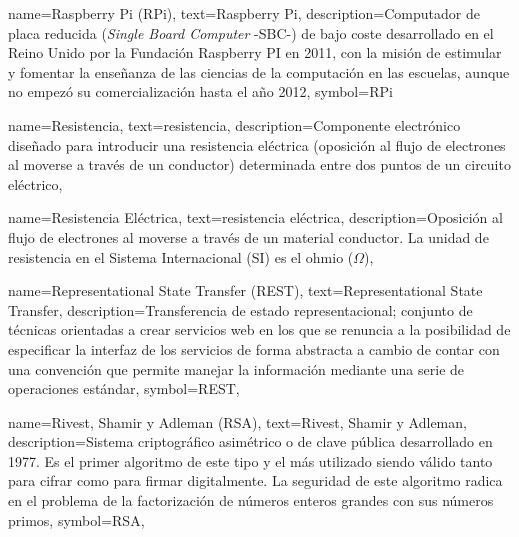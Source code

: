 {
    name={Raspberry Pi (RPi)},
    text={Raspberry Pi},
    description={Computador de placa reducida (\textit{Single Board Computer} -SBC-) de bajo coste desarrollado en el Reino Unido por la Fundación Raspberry PI en 2011, con la misión de estimular y fomentar la enseñanza de las ciencias de la computación en las escuelas, aunque no empezó su comercialización hasta el año 2012},
    symbol={RPi}
}

{
    name={Resistencia},
    text={resistencia},
    description={Componente electrónico diseñado para introducir una resistencia eléctrica (oposición al flujo de electrones al moverse a través de un conductor) determinada entre dos puntos de un circuito eléctrico},
}

{
    name={Resistencia Eléctrica},
    text={resistencia eléctrica},
    description={Oposición al flujo de electrones al moverse a través de un material conductor. La unidad de resistencia en el Sistema Internacional (SI) es el ohmio ($\Omega$)},
}

{
    name={Representational State Transfer (REST)},
    text={Representational State Transfer},
    description={Transferencia de estado representacional; conjunto de técnicas orientadas a crear servicios web en los que se renuncia a la posibilidad de especificar la interfaz de los servicios de forma abstracta a cambio de contar con una convención que permite manejar la información mediante una serie de operaciones estándar},
    symbol={REST},
}

{
    name={Rivest, Shamir y Adleman (RSA)},
    text={Rivest, Shamir y Adleman},
    description={Sistema criptográfico asimétrico o de clave pública desarrollado en 1977. Es el primer algoritmo de este tipo y el más utilizado siendo válido tanto para cifrar como para firmar digitalmente. La seguridad de este algoritmo radica en el problema de la factorización de números enteros grandes con sus números primos},
    symbol={RSA},
}

